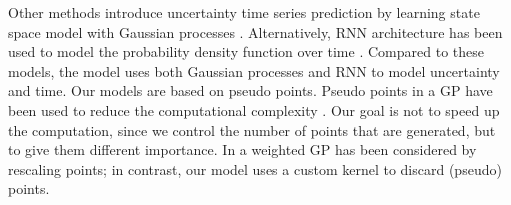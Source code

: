 Other methods introduce uncertainty time series prediction by learning state space model with Gaussian processes \cite{StateSpaceGPIdentification, StateSpaceGP}. Alternatively, RNN architecture has been used to model the probability density function over time \cite{ProbabilityEvolutionRNN}. Compared to these models, the \GPModel model uses both Gaussian processes and RNN to model uncertainty and time. Our models are based on pseudo points. Pseudo points in a GP have been used to reduce the computational complexity \cite{SparseGP}. Our goal is not to speed up the computation, since we control the number of points that are generated, but to give them different importance. In \cite{WeightedGP} a weighted GP has been considered by rescaling points; in contrast, our model uses a custom kernel to discard (pseudo) points.

